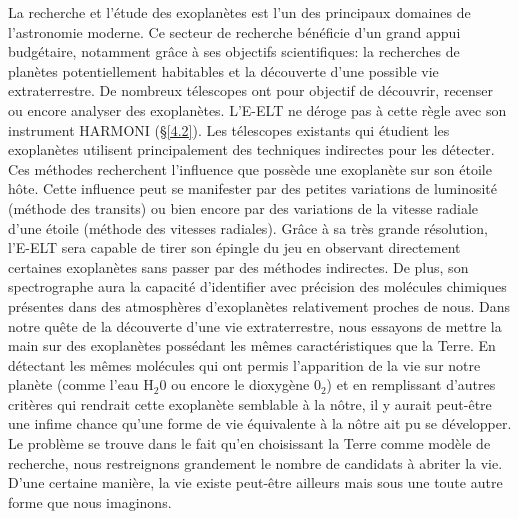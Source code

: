 La recherche et l'étude des exoplanètes est l'un des principaux domaines de l'astronomie moderne. Ce secteur de recherche bénéficie d'un grand appui budgétaire, notamment grâce à ses objectifs scientifiques: la recherches de planètes potentiellement habitables et la découverte d'une possible vie extraterrestre. De nombreux télescopes ont pour objectif de découvrir, recenser ou encore analyser des exoplanètes. L'E-ELT ne déroge pas à cette règle avec son instrument HARMONI (§\ref{4.2}). Les télescopes existants qui étudient les exoplanètes utilisent principalement des techniques indirectes pour les détecter. Ces méthodes recherchent l'influence que possède une exoplanète sur son étoile hôte. Cette influence peut se manifester par des petites variations de luminosité (méthode des transits) ou bien encore par des variations de la vitesse radiale d'une étoile (méthode des vitesses radiales). Grâce à sa très grande résolution, l'E-ELT sera capable de tirer son épingle du jeu en observant directement certaines exoplanètes sans passer par des méthodes indirectes. De plus, son spectrographe aura la capacité d'identifier avec précision des molécules chimiques présentes dans des atmosphères d'exoplanètes relativement proches de nous. Dans notre quête de la découverte d'une vie extraterrestre, nous essayons de mettre la main sur des exoplanètes possédant les mêmes caractéristiques que la Terre. En détectant les mêmes molécules qui ont permis l'apparition de la vie sur notre planète (comme l'eau H$_{2} 0$ ou encore le dioxygène $0_{2}$) et en remplissant d'autres critères qui rendrait cette exoplanète semblable à la nôtre, il y aurait peut-être une infime chance qu'une forme de vie équivalente à la nôtre ait pu se développer. Le problème se trouve dans le fait qu'en choisissant la Terre comme modèle de recherche, nous restreignons grandement le nombre de candidats à abriter la vie. D'une certaine manière, la vie existe peut-être ailleurs mais sous une toute autre forme que nous imaginons.











